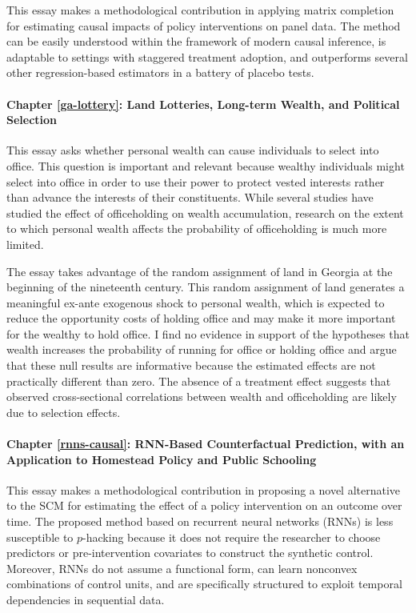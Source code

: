 This essay makes a methodological contribution in applying matrix completion for estimating causal impacts of policy interventions on panel data. The method can be easily understood within the framework of modern causal inference, is adaptable to settings with staggered treatment adoption, and outperforms several other regression-based estimators in a battery of placebo tests.

\paragraph{Chapter \ref{ga-lottery}: Land Lotteries, Long-term Wealth, and Political Selection} 
This essay asks whether personal wealth can cause individuals to select into office. This question is important and relevant because wealthy individuals might select into office in order to use their power to protect vested interests rather than advance the interests of their constituents. While several studies have studied the effect of officeholding on wealth accumulation, research on the extent to which personal wealth affects the probability of officeholding is much more limited.

The essay takes advantage of the random assignment of land in Georgia at the beginning of the nineteenth century. This random assignment of land generates a meaningful ex-ante exogenous shock to personal wealth, which is expected to reduce the opportunity costs of holding office and may make it more important for the wealthy to hold office. I find no evidence in support of the hypotheses that wealth increases the probability of running for office or holding office and argue that these null results are informative because the estimated effects are not practically different than zero. The absence of a treatment effect suggests that observed cross-sectional correlations between wealth and officeholding are likely due to selection effects. 

\paragraph{Chapter \ref{rnns-causal}: RNN-Based Counterfactual Prediction, with an Application to Homestead Policy and Public Schooling}

This essay makes a methodological contribution in proposing a novel alternative to the SCM for estimating the effect of a policy intervention on an outcome over time. The proposed method based on recurrent neural networks (RNNs) is less susceptible to $p$-hacking because it does not require the researcher to choose predictors or pre-intervention covariates to construct the synthetic control. Moreover, RNNs do not assume a functional form, can learn nonconvex combinations of control units, and are specifically structured to exploit temporal dependencies in sequential data.

